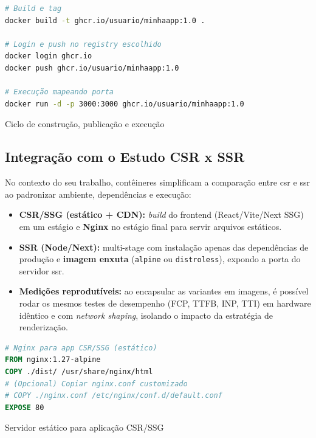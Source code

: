 \begin{codigo}[H]
\begin{lstlisting}[language=bash]
# Build e tag
docker build -t ghcr.io/usuario/minhaapp:1.0 .

# Login e push no registry escolhido
docker login ghcr.io
docker push ghcr.io/usuario/minhaapp:1.0

# Execução mapeando porta
docker run -d -p 3000:3000 ghcr.io/usuario/minhaapp:1.0
\end{lstlisting}
\caption{Ciclo de construção, publicação e execução}
\label{lst:docker-workflow}
\end{codigo}

\subsection{Integração com o Estudo CSR x SSR}
\label{sec:docker-csr-ssr}

No contexto do seu trabalho, contêineres simplificam a comparação entre \acrshort{csr} e \acrshort{ssr} ao padronizar ambiente, dependências e execução:

\begin{itemize}
  \item \textbf{CSR/SSG (estático + CDN):} \textit{build} do frontend (React/Vite/Next SSG) em um estágio e \textbf{Nginx} no estágio final para servir arquivos estáticos.  
  \item \textbf{SSR (Node/Next):} multi-stage com instalação apenas das dependências de produção e \textbf{imagem enxuta} (\texttt{alpine} ou \texttt{distroless}), expondo a porta do servidor \acrshort{ssr}.
  \item \textbf{Medições reprodutíveis:} ao encapsular as variantes em imagens, é possível rodar os mesmos testes de desempenho (FCP, TTFB, INP, TTI) em hardware idêntico e com \textit{network shaping}, isolando o impacto da estratégia de renderização.
\end{itemize}

\begin{codigo}[H]
\begin{lstlisting}[language=Dockerfile]
# Nginx para app CSR/SSG (estático)
FROM nginx:1.27-alpine
COPY ./dist/ /usr/share/nginx/html
# (Opcional) Copiar nginx.conf customizado
# COPY ./nginx.conf /etc/nginx/conf.d/default.conf
EXPOSE 80
\end{lstlisting}
\caption{Servidor estático para aplicação CSR/SSG}
\label{lst:dockerfile-nginx-static}
\end{codigo}

